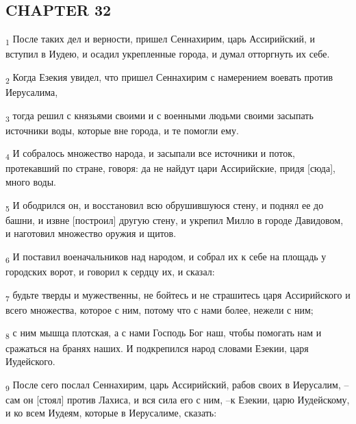 \subsection{CHAPTER 32}
\begin{tcolorbox}
\textsubscript{1} После таких дел и верности, пришел Сеннахирим, царь Ассирийский, и вступил в Иудею, и осадил укрепленные города, и думал отторгнуть их себе.
\end{tcolorbox}
\begin{tcolorbox}
\textsubscript{2} Когда Езекия увидел, что пришел Сеннахирим с намерением воевать против Иерусалима,
\end{tcolorbox}
\begin{tcolorbox}
\textsubscript{3} тогда решил с князьями своими и с военными людьми своими засыпать источники воды, которые вне города, и те помогли ему.
\end{tcolorbox}
\begin{tcolorbox}
\textsubscript{4} И собралось множество народа, и засыпали все источники и поток, протекавший по стране, говоря: да не найдут цари Ассирийские, придя [сюда], много воды.
\end{tcolorbox}
\begin{tcolorbox}
\textsubscript{5} И ободрился он, и восстановил всю обрушившуюся стену, и поднял ее до башни, и извне [построил] другую стену, и укрепил Милло в городе Давидовом, и наготовил множество оружия и щитов.
\end{tcolorbox}
\begin{tcolorbox}
\textsubscript{6} И поставил военачальников над народом, и собрал их к себе на площадь у городских ворот, и говорил к сердцу их, и сказал:
\end{tcolorbox}
\begin{tcolorbox}
\textsubscript{7} будьте тверды и мужественны, не бойтесь и не страшитесь царя Ассирийского и всего множества, которое с ним, потому что с нами более, нежели с ним;
\end{tcolorbox}
\begin{tcolorbox}
\textsubscript{8} с ним мышца плотская, а с нами Господь Бог наш, чтобы помогать нам и сражаться на бранях наших. И подкрепился народ словами Езекии, царя Иудейского.
\end{tcolorbox}
\begin{tcolorbox}
\textsubscript{9} После сего послал Сеннахирим, царь Ассирийский, рабов своих в Иерусалим, --сам он [стоял] против Лахиса, и вся сила его с ним, --к Езекии, царю Иудейскому, и ко всем Иудеям, которые в Иерусалиме, сказать:
\end{tcolorbox}
